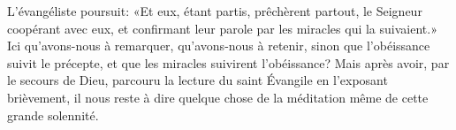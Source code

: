 L’évangéliste poursuit:
	«Et eux, étant partis, prêchèrent partout,
	le Seigneur coopérant avec eux,
	et confirmant leur parole par les miracles qui la suivaient.»
Ici qu’avons-nous à remarquer, qu’avons-nous à retenir,
	sinon que l’obéissance suivit le précepte,
	et que les miracles suivirent l’obéissance?
Mais après avoir, par le secours de Dieu,
	parcouru la lecture du saint Évangile en l’exposant brièvement,
	il nous reste à dire quelque chose
		de la méditation même de cette grande solennité.
